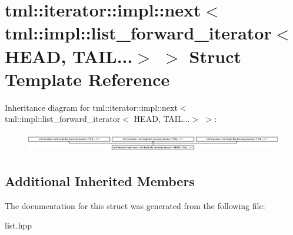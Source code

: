 \hypertarget{structtml_1_1iterator_1_1impl_1_1next_3_01tml_1_1impl_1_1list__forward__iterator_3_01HEAD_00_01TAIL_8_8_8_4_01_4}{\section{tml\+:\+:iterator\+:\+:impl\+:\+:next$<$ tml\+:\+:impl\+:\+:list\+\_\+forward\+\_\+iterator$<$ H\+E\+A\+D, T\+A\+I\+L...$>$ $>$ Struct Template Reference}
\label{structtml_1_1iterator_1_1impl_1_1next_3_01tml_1_1impl_1_1list__forward__iterator_3_01HEAD_00_01TAIL_8_8_8_4_01_4}
}
Inheritance diagram for tml\+:\+:iterator\+:\+:impl\+:\+:next$<$ tml\+:\+:impl\+:\+:list\+\_\+forward\+\_\+iterator$<$ H\+E\+A\+D, T\+A\+I\+L...$>$ $>$\+:\begin{figure}[H]
\begin{center}
\leavevmode
\includegraphics[height=0.878431cm]{structtml_1_1iterator_1_1impl_1_1next_3_01tml_1_1impl_1_1list__forward__iterator_3_01HEAD_00_01TAIL_8_8_8_4_01_4}
\end{center}
\end{figure}
\subsection*{Additional Inherited Members}


The documentation for this struct was generated from the following file\+:\begin{DoxyCompactItemize}
\item 
list.\+hpp\end{DoxyCompactItemize}
